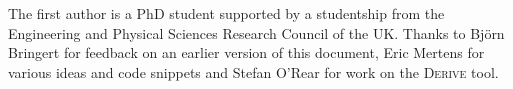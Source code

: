 \documentclass[preprint]{sigplanconf}
\begin{document}
\begin{comment}
<p>
    To define the <tt>PlayEx</tt> class, there are three combinatiors that can be used. These automate much of the definition:
</p>
<pre class="define">
play :: on -> ([with],[with] -> on)
(/\) :: PlayEx item with => ([with], [with] -> item -> on) -> item -> ([with], [with] -> on)
(/\!) :: ([with], [with] -> item -> on) -> item -> ([with], [with] -> on)
</pre>
<p>
    Note, the above are presented with type signatures for completeness. They are intended to be used mechanically, without excessive thought.
</p>
<p>
    To define a PlayEx instance for the Expr type introduced earlier:
</p>
<pre>
instance PlayEx Expr a where
    replaceChildrenEx x =
        case x of
            Val a -> play Val /\! a
            Add a b -> play Add /\ a /\ b
            Sub a b -> play Sub /\ a /\ b
            ...
            Neg a -> play Neg /\ a
</pre>
<p>
    The definition follows mechanically. The only choice a user makes is whether to use the <tt>(/\)</tt> operator (which recurses into the child on the right), or the <tt>(/\!)</tt> operator, which doesn't. For example, here we have decided not to traverse inside the <tt>Int</tt> of <tt>Val</tt>. This can be changed, and would require a PlayEx instance for <tt>Int</tt>.
</p>
<p>
    If using this style of definition, a special instance must be defined for the self case:
</p>
<pre>
instance PlayEx Expr Expr where
    replaceChildrenEx = playSelf
</pre>
<p>
    Unfortunately this requires undecidable instances. A Play instance still needs to be written for each definition.
</p>

<h3>Using Scrap Your Boilerplate instances</h3>

<p>
    To define Play and PlayEx instances for all types, in all combinations, simply:
</p>
<pre>
import Data.PlaySYB

data Expr ... deriving (Typeable, Data)
</pre>
<p>
    The disadvatages of this are the lack of type safety - you can now do entirely meaningless operations, which the earlier definitions would have spotted as being an error. This code will also only work where <tt>Data.Generics</tt> is supported, namely GHC at the present time.
</p>
<p>
    The clear advantage is that there is almost no work to creating Play instances.
</p>




%
\end{comment}
\acks

The first author is a PhD student supported by a studentship from the Engineering and Physical Sciences Research Council of the UK. Thanks to Bj\"{o}rn Bringert for feedback on an earlier version of this document, Eric Mertens for various ideas and code snippets and Stefan O'Rear for work on the \textsc{Derive} tool.



\end{document}

